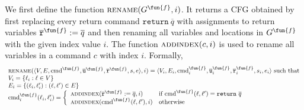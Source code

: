 We first define the function $\textsc{rename}(G^\fun{f},i)$.
It returns a CFG obtained by first replacing every return command
$\mathtt{return}\ \overline{q}$ with assignments to return variables
$\overline{\texttt{r}}^\fun{f} := \overline{q}$ and then renaming all variables
and locations in $G^\fun{f}$ with the given index value $i$.
The function $\textsc{addindex}(c, i)$ is used to rename all variables in a
command $c$ with index $i$.
Formally,
\[
\begin{array}{l}
\textsc{rename}(\langle V, E,\textmd{cmd}^\fun{f},\overline{\texttt{u}}^\fun{f},
\overline{\texttt{r}}^\fun{f},s,e \rangle,i)
= \langle V_i, E_i,\textmd{cmd}_i^\fun{f},\overline{\texttt{u}}_i^\fun{f},
\overline{\texttt{r}}_i^\fun{f},s_i,e_i \rangle \text{ such that}\\

V_i = \{\ell_i:\ell \in V\} \\

E_i = \{(\ell_i,\ell'_i): (\ell,\ell') \in E\} \\

\textmd{cmd}_i^\fun{f}(\ell_i,\ell'_i) =
  \left\{
  \begin{array}{ll}
   \textsc{addindex}(\overline{\texttt{r}}^\fun{f}:=\overline{q}, i) &
     \text{if }\textmd{cmd}^\fun{f}(\ell,\ell')=\mathtt{return}\ \overline{q} \\
   \textsc{addindex}(\textmd{cmd}^\fun{f}(\ell,\ell'), i) &
     \text{otherwise}
  \end{array}
  \right.
\end{array}
\]

